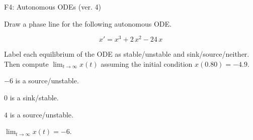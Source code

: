 \begin{exercise}
  \begin{exerciseTitle}F4: Autonomous ODEs (ver. 4)\end{exerciseTitle}
  \begin{exerciseStatement}
    

      Draw a phase line for the following 
      autonomous ODE.
    

    
\[x'= x^{3} + 2 \, x^{2} - 24 \, x\]

    

      Label each equilibrium of the ODE
      as stable/unstable and sink/source/neither.
      Then compute \(\lim_{t\to\infty}x(t)\)
      assuming the initial condition
      \(x( 0.80 )= -4.9\).
    

  \end{exerciseStatement}
  \begin{exerciseAnswer}
    

      \(-6\) is a source/unstable.
      
        \(0\) is a sink/stable.
      
      \(4\) is a source/unstable.
    

    

      \(\lim_{t\to\infty}x(t)=-6\).
    

  \end{exerciseAnswer}
\end{exercise}